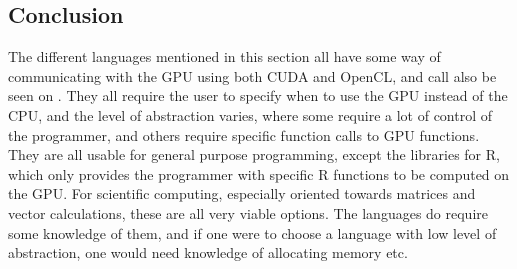  

\subsection{Conclusion}  

The different languages mentioned in this section all have some way of communicating with the GPU using both CUDA and OpenCL, and call also be seen on  .
They all require the user to specify when to use the GPU instead of the CPU, and the level of abstraction varies, where some require a lot of control of the programmer, and others require specific function calls to GPU functions. 
They are all usable for general purpose programming, except the libraries for R, which only provides the programmer with specific R functions to be computed on the GPU.
For scientific computing, especially oriented towards matrices and vector calculations, these are all very viable options.
The languages do require some knowledge of them, and if one were to choose a language with low level of abstraction, one would need knowledge of allocating memory etc.

                     